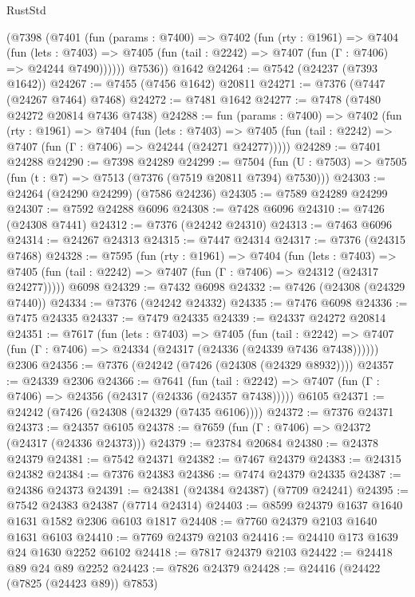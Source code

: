 \begin{lexlean}{RustStd}
\begin{coremodule}
      (@7398
        (@7401
          (fun (params : @7400) =>
          @7402
            (fun (rty : @1961) =>
            @7404
              (fun (lets : @7403) =>
              @7405 (fun (tail : @2242) => @7407 (fun (Γ : @7406) => @24244 @7490))))))
        @7536))
    @1642
@24264 := @7542 (@24237 (@7393 @1642))
@24267 := @7455 (@7456 @1642) @20811
@24271 := @7376 (@7447 (@24267 @7464) @7468)
@24272 := @7481 @1642
@24277 := @7478 (@7480 @24272 @20814 @7436 @7438)
@24288 := fun (params : @7400) =>
  @7402
    (fun (rty : @1961) =>
    @7404
      (fun (lets : @7403) =>
      @7405 (fun (tail : @2242) => @7407 (fun (Γ : @7406) => @24244 (@24271 @24277)))))
@24289 := @7401 @24288
@24290 := @7398 @24289
@24299 := @7504
    (fun (U : @7503) => @7505 (fun (t : @7) => @7513 (@7376 (@7519 @20811 @7394) @7530)))
@24303 := @24264 (@24290 @24299) (@7586 @24236)
@24305 := @7589 @24289 @24299
@24307 := @7592 @24288 @6096
@24308 := @7428 @6096
@24310 := @7426 (@24308 @7441)
@24312 := @7376 (@24242 @24310)
@24313 := @7463 @6096
@24314 := @24267 @24313
@24315 := @7447 @24314
@24317 := @7376 (@24315 @7468)
@24328 := @7595
    (fun (rty : @1961) =>
    @7404
      (fun (lets : @7403) =>
      @7405 (fun (tail : @2242) => @7407 (fun (Γ : @7406) => @24312 (@24317 @24277)))))
    @6098
@24329 := @7432 @6098
@24332 := @7426 (@24308 (@24329 @7440))
@24334 := @7376 (@24242 @24332)
@24335 := @7476 @6098
@24336 := @7475 @24335
@24337 := @7479 @24335
@24339 := @24337 @24272 @20814
@24351 := @7617
    (fun (lets : @7403) =>
    @7405
      (fun (tail : @2242) =>
      @7407 (fun (Γ : @7406) => @24334 (@24317 (@24336 (@24339 @7436 @7438))))))
    @2306
@24356 := @7376 (@24242 (@7426 (@24308 (@24329 @8932))))
@24357 := @24339 @2306
@24366 := @7641
    (fun (tail : @2242) => @7407 (fun (Γ : @7406) => @24356 (@24317 (@24336 (@24357 @7438)))))
    @6105
@24371 := @24242 (@7426 (@24308 (@24329 (@7435 @6106))))
@24372 := @7376 @24371
@24373 := @24357 @6105
@24378 := @7659 (fun (Γ : @7406) => @24372 (@24317 (@24336 @24373)))
@24379 := @23784 @20684
@24380 := @24378 @24379
@24381 := @7542 @24371
@24382 := @7467 @24379
@24383 := @24315 @24382
@24384 := @7376 @24383
@24386 := @7474 @24379 @24335
@24387 := @24386 @24373
@24391 := @24381 (@24384 @24387) (@7709 @24241)
@24395 := @7542 @24383 @24387 (@7714 @24314)
@24403 := @8599 @24379 @1637 @1640 @1631 @1582 @2306 @6103 @1817
@24408 := @7760 @24379 @2103 @1640 @1631 @6103
@24410 := @7769 @24379 @2103
@24416 := @24410 @173 @1639 @24 @1630 @2252 @6102
@24418 := @7817 @24379 @2103
@24422 := @24418 @89 @24 @89 @2252
@24423 := @7826 @24379
@24428 := @24416 (@24422 (@7825 (@24423 @89)) @7853)

\end{coremodule}
\end{lexlean}
